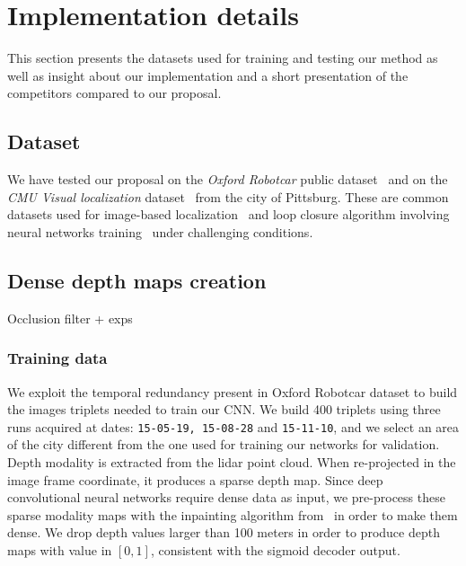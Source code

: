 \section{Implementation details}
\label{sec:impl_details}



This section presents the datasets used for training and testing our method as well as insight about our implementation and a short presentation of the competitors compared to our proposal.

\subsection{Dataset}
\label{subsec:dataset}
	We have tested our proposal on the \textit{Oxford Robotcar} public dataset~\cite{Maddern2016} and on the \textit{CMU Visual localization} dataset~\cite{Bansal2014a} from the city of Pittsburg. These are common datasets used for image-based localization~\cite{Sattler2018} and loop closure algorithm involving neural networks training~\cite{Porav2018} under challenging conditions.
		
\subsection{Dense depth maps creation}
Occlusion filter + exps

\subsubsection{Training data}
	We exploit the temporal redundancy present in Oxford Robotcar dataset to build the images triplets needed to train our CNN. We build 400 triplets using three runs acquired at dates: \texttt{15-05-19, 15-08-28} and \texttt{15-11-10}, and we select an area of the city different from the one used for training our networks for validation.
	Depth modality is extracted from the lidar point cloud. When re-projected in the image frame coordinate, it produces a sparse depth map. Since deep convolutional neural networks require dense data as input, we pre-process these sparse modality maps with the inpainting algorithm from~\cite{Bevilacqua2017} in order to make them dense. We drop depth values larger than 100 meters in order to produce depth maps with value in $[0, 1]$, consistent with the sigmoid decoder output.



